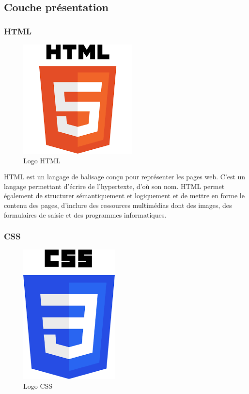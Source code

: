 \subsection{Couche présentation}

\subsubsection{HTML}

\begin{figure}[H]
    \centering
    \includegraphics[scale=0.3]{Logos/html.png}
    \caption{Logo HTML}
\end{figure}

HTML est un langage de balisage conçu pour représenter
les pages web. C’est un langage permettant d’écrire de l’hypertexte, d’où son nom. HTML permet également de structurer sémantiquement et logiquement et de mettre en forme
le contenu des pages, d’inclure des ressources multimédias
dont des images, des formulaires de saisie et des programmes
informatiques.

\subsubsection{CSS}

\begin{figure}[H]
    \centering
    \includegraphics[scale=0.3]{Logos/css.png}
    \caption{Logo CSS}
\end{figure}

